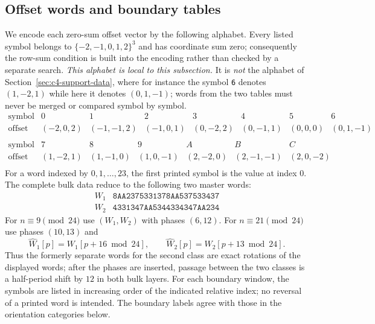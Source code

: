 \subsection{Offset words and boundary tables}\label{sec:offset-data}
We encode each zero-sum offset vector by the following alphabet.  Every listed symbol belongs
to \(\{-2,-1,0,1,2\}^3\) and has coordinate sum zero; consequently the row-sum condition
is built into the encoding rather than checked by a separate search.
\emph{This alphabet is local to this subsection.} It is \emph{not} the alphabet of
Section~\ref{sec:c4-support-data}, where for instance the symbol \texttt{6} denotes
\((1,-2,1)\) while here it denotes \((0,1,-1)\); words from the two tables must never be merged or
compared symbol by symbol.
\begingroup\scriptsize
\[
\begin{array}{c|ccccccc}
\text{symbol}&0&1&2&3&4&5&6\\\hline
\text{offset}&(-2,0,2)&(-1,-1,2)&(-1,0,1)&(0,-2,2)&(0,-1,1)&(0,0,0)&(0,1,-1)\\
\end{array}
\]
\endgroup
\begingroup\scriptsize
\[
\begin{array}{c|cccccc}
\text{symbol}&7&8&9&A&B&C\\\hline
\text{offset}&(1,-2,1)&(1,-1,0)&(1,0,-1)&(2,-2,0)&(2,-1,-1)&(2,0,-2)\\
\end{array}
\]
\endgroup
For a word indexed by \(0,1,\ldots,23\), the first printed symbol is the value at index \(0\).
The complete bulk data reduce to the following two master words:
\[
\begin{array}{c|c}
W_1&\mathtt{8AA2375331378AA537533437}\\
W_2&\mathtt{4331347AA5344334347AA234}
\end{array}
\]
For $n\equiv9\pmod{24}$ use $(W_1,W_2)$ with phases $(6,12)$.  For
$n\equiv21\pmod{24}$ use phases $(10,13)$ and
\begin{equation}\label{eq:c3-word-shift}
 \widehat W_1[p]=W_1[p+16\bmod24],\qquad
 \widehat W_2[p]=W_2[p+13\bmod24].
\end{equation}
Thus the formerly separate words for the second class are exact rotations of the displayed words;
after the phases are inserted, passage between the two classes is a half-period shift by $12$ in
both bulk layers.
For each boundary window, the symbols are listed in increasing order of the indicated relative
index; no reversal of a printed word is intended.
The boundary labels agree with those in the orientation categories below.
